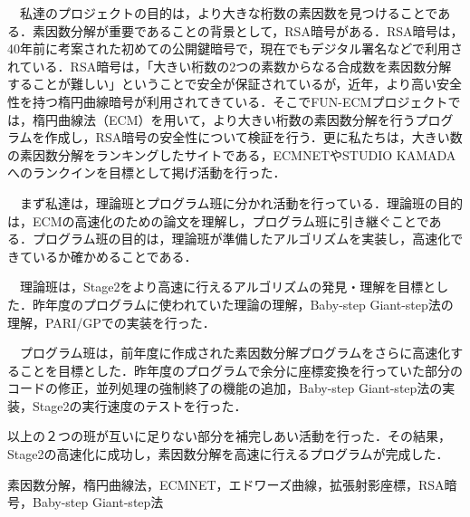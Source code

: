 \documentclass[openany,11pt,papersize]{jsbook}
\begin{document}
%
\maketitle

\frontmatter

\begin{jabstract}

　私達のプロジェクトの目的は，より大きな桁数の素因数を見つけることである．素因数分解が重要であることの背景として，RSA暗号がある．RSA暗号は，40年前に考案された初めての公開鍵暗号で，現在でもデジタル署名などで利用されている．RSA暗号は，「大きい桁数の2つの素数からなる合成数を素因数分解することが難しい」ということで安全が保証されているが，近年，より高い安全性を持つ楕円曲線暗号が利用されてきている．そこでFUN-ECMプロジェクトでは，楕円曲線法（ECM）を用いて，より大きい桁数の素因数分解を行うプログラムを作成し，RSA暗号の安全性について検証を行う．更に私たちは，大きい数の素因数分解をランキングしたサイトである，ECMNET\cite{EN2017}やSTUDIO KAMADA\cite{SK2017}へのランクインを目標として掲げ活動を行った．

　まず私達は，理論班とプログラム班に分かれ活動を行っている．理論班の目的は，ECMの高速化のための論文を理解し，プログラム班に引き継ぐことである．プログラム班の目的は，理論班が準備したアルゴリズムを実装し，高速化できているか確かめることである．

　理論班は，Stage2をより高速に行えるアルゴリズムの発見・理解を目標とした．昨年度のプログラムに使われていた理論の理解，Baby-step Giant-step法の理解，PARI/GPでの実装を行った．

　プログラム班は，前年度に作成された素因数分解プログラムをさらに高速化することを目標とした．昨年度のプログラムで余分に座標変換を行っていた部分のコードの修正，並列処理の強制終了の機能の追加，Baby-step Giant-step法の実装，Stage2の実行速度のテストを行った．

以上の２つの班が互いに足りない部分を補完しあい活動を行った．その結果，Stage2の高速化に成功し，素因数分解を高速に行えるプログラムが完成した．



\begin{jkeyword}
素因数分解，楕円曲線法，ECMNET，エドワーズ曲線，拡張射影座標，RSA暗号，Baby-step Giant-step法
\end{jkeyword}
\end{jabstract}

\end{document}
